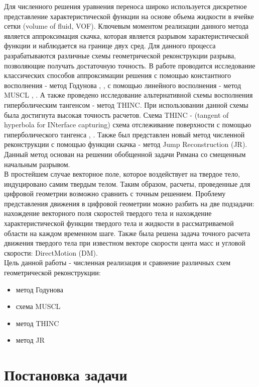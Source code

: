 \documentclass[12pt,a4paper]{article}
\begin{document}
Для численного решения уравнения переноса широко используется  дискретное представление характеристической функции на основе объема жидкости в ячейке сетки (volume of fluid, VOF). Ключевым моментом реализации данного метода является аппроксимация скачка, которая является разрывом характеристической функции и наблюдается на границе двух сред. Для данного процесса разрабатываются различные схемы геометрической реконструкции разрыва, позволяющие получать достаточную точность. В работе проводится исследование классических способов аппроксимации решения с помощью константного восполнения - метод Годунова \cite{Godunov_diff_scheme}, \cite{Godunov_num_method}, с помощью линейного восполнения - метод MUSCL \cite{MUSCL_Bochkarev}, \cite{MUSCL_Kostushin}. А также проведено исследование альтернативной схемы восполнения гиперболическим тангенсом - метод THINC. При использовании данной схемы была достигнута высокая точность расчетов. Схема THINC - (tangent of hyperbola for INterface capturing) схема отслеживание поверхности с помощью гиперболического тангенса \cite{THINC_Xiao}, \cite{THINC_Kumar}. Также был представлен новый метод численной реконструкции с помощью функции скачка - метод Jump Reconstruction (JR). Данный метод основан на решении обобщенной задачи Римана со смещенным начальным разрывом.\\
В простейшем случае векторное поле, которое воздействует на твердое тело, индуцировано самим твердым телом. Таким образом, расчеты, проведенные для цифровой геометрии возможно сравнить с точным решением. Проблему представления движения в цифровой геометрии можно разбить на две подзадачи: нахождение векторного поля скоростей твердого тела и нахождение характеристической функции твердого тела и жидкости в рассматриваемой области на каждом временном шаге. Также была решена задача точного расчета движения твердого тела при известном векторе скорости цента масс и угловой скорости: DirectMotion (DM).\\
Цель данной работы - численная реализация и сравнение различных схем геометрической реконструкции:
\begin{itemize}
  \item метод Годунова
  \item схема MUSCL
  \item метод THINC
  \item метод JR
\end{itemize}

\section{Постановка задачи}
\end{document}
